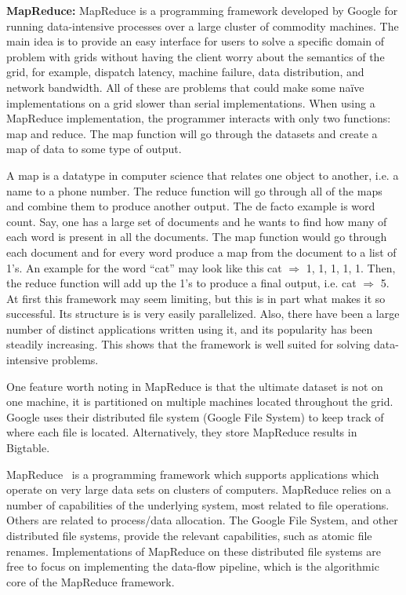\documentclass[conference,final]{IEEEtran}
\begin{document}
{\bf MapReduce: } MapReduce is a programming framework developed by
Google for running data-intensive processes over a large cluster of
commodity machines.  The main idea is to provide an easy interface for
users to solve a specific domain of problem with grids without having
the client worry about the semantics of the grid, for example,
dispatch latency, machine failure, data distribution, and network
bandwidth.  All of these are problems that could make some naïve
implementations on a grid slower than serial implementations.  When
using a MapReduce implementation, the programmer interacts with only
two functions: map and reduce.  The map function will go through the
datasets and create a map of data to some type of output.

A map is a datatype in computer science that relates one object to
another, i.e. a name to a phone number.  The reduce function will go
through all of the maps and combine them to produce another output.
The de facto example is word count.  Say, one has a large set of
documents and he wants to find how many of each word is present in all
the documents.  The map function would go through each document and
for every word produce a map from the document to a list of 1’s.  An
example for the word “cat” may look like this cat $\Rightarrow$ 1, 1,
1, 1, 1.  Then, the reduce function will add up the 1’s to produce a
final output, i.e. cat $\Rightarrow$ 5.  At first this framework may
seem limiting, but this is in part what makes it so successful.  Its
structure is is very easily parallelized.  Also, there have been a
large number of distinct applications written using it, and its
popularity has been steadily increasing.  This shows that the
framework is well suited for solving data-intensive problems.

One feature worth noting in MapReduce is that the ultimate dataset is
not on one machine, it is partitioned on multiple machines located
throughout the grid. Google uses their distributed file system (Google
File System) to keep track of where each file is located.
Alternatively, they store MapReduce results in Bigtable.  %

MapReduce~\cite{mapreduce-paper} is a programming framework which
supports applications which operate on very large data sets on
clusters of computers.  MapReduce relies on a number of capabilities
of the underlying system, most related to file operations.  Others are 
related to process/data allocation.  The Google File System, and other
distributed file systems, provide the relevant capabilities, such as atomic
file renames.  Implementations of MapReduce on these distributed file systems
are free to focus on implementing the data-flow pipeline, which is the
algorithmic core of the MapReduce framework.
\end{document}
